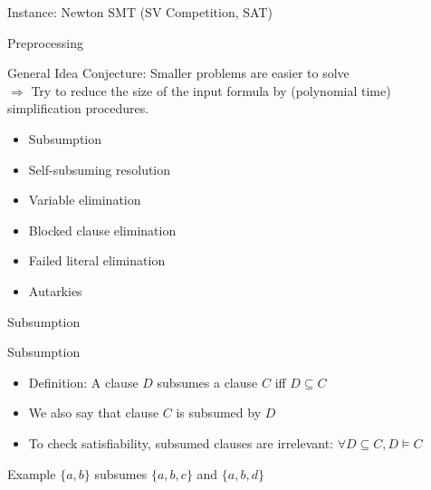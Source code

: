 \documentclass[t]{sdqbeamer}
\begin{document}
\begin{frame}{Instance: Newton SMT (SV Competition, SAT)}
{}
\end{frame}

    
\begin{frame}{Preprocessing}
    \begin{block}{General Idea}
      Conjecture: Smaller problems are easier to solve\\[1em]
      $\Longrightarrow$ Try to reduce the size of the input formula by (polynomial time) simplification procedures.
    \begin{itemize}
      \item Subsumption
      \item Self-subsuming resolution
      \item Variable elimination
      \item Blocked clause elimination
      \item Failed literal elimination
      \item Autarkies
    \end{itemize}
    \end{block}
    \end{frame}
    
    
    \begin{frame}{Subsumption}
    \begin{block}{Subsumption}
    \begin{itemize}
    \item Definition: A clause $D$ subsumes a clause $C$ iff $D \subseteq C$
    \item We also say that clause $C$ is subsumed by $D$
    \item To check satisfiability, subsumed clauses are irrelevant: $\forall D \subseteq C, D \models C$
    \end{itemize}
    \end{block}
    
    \begin{exampleblock}{Example}
    $\{a, b\}$ subsumes $\{a, b, c\}$ and $\{a, b, d\}$
    \end{exampleblock}
    \end{frame}
    
\end{document}
